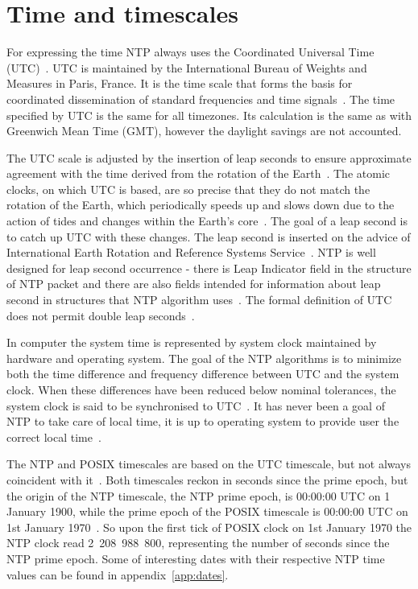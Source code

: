 
\section{Time and timescales}\label{sec:ntp-time}
For expressing the time NTP always uses the Coordinated Universal Time (UTC)~\cite{rfc5905}.
UTC is maintained by the International Bureau of Weights and Measures in Paris, France.
It is the time scale that forms the basis for coordinated dissemination
of standard frequencies and time signals~\cite{bipm-utc}.
The time specified by UTC is the same for all timezones.
Its calculation is the same as with Greenwich Mean Time (GMT),
however the daylight savings are not accounted.

The UTC scale is adjusted by the insertion of leap seconds to ensure approximate
agreement with the time derived from the rotation of the Earth~\cite{bipm-utc}.
The atomic clocks, on which UTC is based, are so precise that
they do not match the rotation of the Earth,
which periodically speeds up and slows down due to the action
of tides and changes within the Earth's core~\cite{cnn-earth}.
The goal of a leap second is to catch up UTC with these changes.
The leap second is inserted on the advice of International Earth Rotation and Reference Systems Service~\cite{bipm-utc}.
NTP is well designed for leap second occurrence -
there is Leap Indicator field
in the structure of NTP packet and there are also fields intended for
information about leap second in structures that NTP algorithm uses~\cite{rfc5905}.
The formal definition of UTC does not permit double leap seconds~\cite{posix}.

In computer the system time is represented by system clock maintained by
hardware and operating system.
The goal of the NTP algorithms is to minimize
both the time difference and frequency difference between UTC and the system clock.
When these differences have been reduced below nominal
tolerances, the system clock is said to be synchronised to UTC~\cite{rfc5905}.
It has never been a goal of NTP to take care of local time,
it is up to operating system to provide user the correct local time~\cite{ntp-overview}.

The NTP and POSIX timescales are based on the UTC timescale,
but not always coincident with it~\cite{ntp-leap}.
Both timescales reckon in seconds since the prime epoch,
but the origin of the NTP timescale, the NTP prime epoch, is 00:00:00 UTC on 1 January 1900,
while the prime epoch of the POSIX timescale is 00:00:00 UTC on 1st January 1970~\cite{ntp-leap}.
So upon the first tick of POSIX clock on 1st January 1970 the NTP clock read 2~208~988~800,
representing the number of seconds since the NTP prime epoch.
Some of interesting dates with their respective NTP time values
can be found in appendix~\ref{app:dates}.
